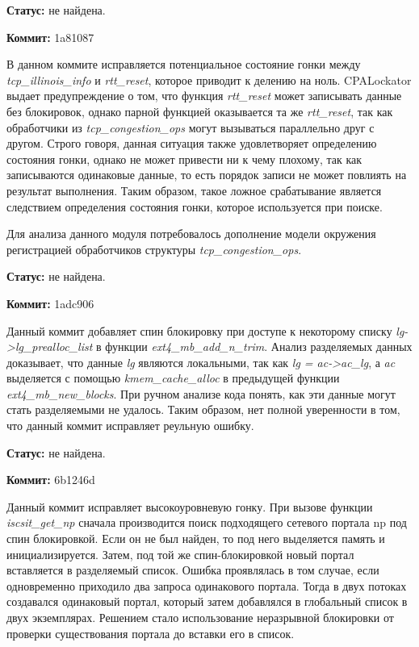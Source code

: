 \textbf{Статус:} не найдена.

\vspace{1cm}

\textbf{Коммит:} 1a81087

В данном коммите исправляется потенциальное состояние гонки между \textit{tcp\_illinois\_info} и \textit{rtt\_reset}, которое приводит к делению на ноль.
CPALockator выдает предупреждение о том, что функция \textit{rtt\_reset} может записывать данные без блокировок, однако парной функцией оказывается та же \textit{rtt\_reset}, так как обработчики из \textit{tcp\_congestion\_ops} могут вызываться параллельно друг с другом.
Строго говоря, данная ситуация также удовлетворяет определению состояния гонки, однако не может привести ни к чему плохому, так как записываются одинаковые данные, то есть порядок записи не может повлиять на результат выполнения.
Таким образом, такое ложное срабатывание является следствием определения состояния гонки, которое используется при поиске. 

Для анализа данного модуля потребовалось дополнение модели окружения регистрацией обработчиков структуры \textit{tcp\_congestion\_ops}.

\textbf{Статус:} не найдена.

\vspace{1cm}

\textbf{Коммит:} 1adc906

Данный коммит добавляет спин блокировку при доступе к некоторому списку \textit{lg->lg\_prealloc\_list} в функции \textit{ext4\_mb\_add\_n\_trim}.
Анализ разделяемых данных доказывает, что данные \textit{lg} являются локальными, так как \textit{lg = ac->ac\_lg}, а \textit{ac} выделяется с помощью \textit{kmem\_cache\_alloc} в предыдущей функции \textit{ext4\_mb\_new\_blocks}. 
При ручном анализе кода понять, как эти данные могут стать разделяемыми не удалось.
Таким образом, нет полной уверенности в том, что данный коммит исправляет реульную ошибку.

\textbf{Статус:} не найдена.

\vspace{1cm}

\textbf{Коммит:} 6b1246d

Данный коммит исправляет высокоуровневую гонку.
При вызове функции \textit{iscsit\_get\_np} сначала производится поиск подходящего сетевого портала np под спин блокировкой.
Если он не был найден, то под него выделяется память и инициализируется.
Затем, под той же спин-блокировкой новый портал вставляется в разделяемый список.
Ошибка проявлялась в том случае, если одновременно приходило два запроса одинакового портала.
Тогда в двух потоках создавался одинаковый портал, который затем добавлялся в глобальный список в двух экземплярах.
Решением стало использование неразрывной блокировки от проверки существования портала до вставки его в список.

